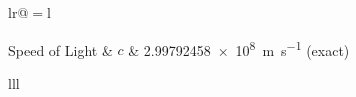 \documentclass[
11pt, %
english, %
singlespacing, %
headsepline, %
]{MastersDoctoralThesis} %
\begin{document}

\begin{constants}{lr@{${}={}$}l} %


	Speed of Light  & $c$ & \SI{2.99792458e8}{\meter\per\second} (exact)\\

\end{constants}


\begin{symbols}{lll} %



\end{symbols}




\mainmatter %

\pagestyle{thesis} %



% 
%




 
%

\end{document}
